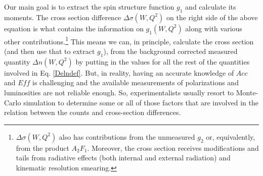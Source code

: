 Our main goal is to extract the spin structure function $g_1$ and calculate its moments. 
The cross section difference $\Delta \sigma (W,Q^2) $ on the right side of the above equation is what contains the information on 
$g_1(W,Q^2)$ along with various other contributions.\footnote{$\Delta \sigma (W,Q^2) $ also has contributions from the unmeasured 
$g_2$ or, equivalently, from the product $A_2F_1$. Moreover, the cross section receives modifications and tails from radiative effects (both internal and external radiation) and kinematic resolution smearing.} This means we can, in principle, calculate the cross section (and then use that to extract $g_1$), from the background corrected measured quantity $\Delta n (W,Q^2)$ by putting in the values for all the rest of the quantities involved in Eq. \ref{Delndef}. But, in reality, having an accurate knowledge of $Acc$ and $Eff$ is challenging and %
the available measurements of polarizations and luminosities are not reliable enough. So, experimentalists %
usually resort to Monte-Carlo simulation to determine some or all of those factors that are involved in the relation between the counts and cross-section differences.

